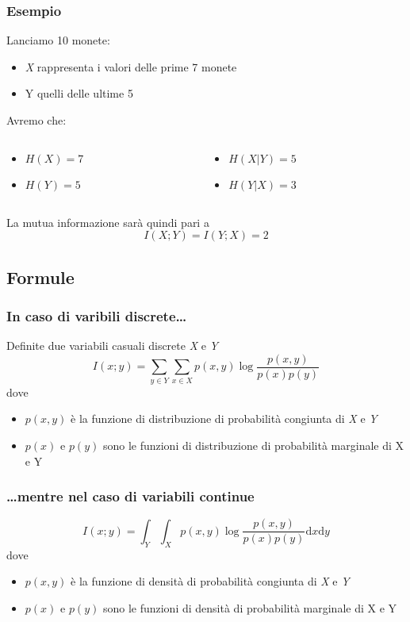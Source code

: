 \documentclass{beamer}
\begin{document}
\begin{frame}
	\frametitle{Esempio}
	Lanciamo 10 monete:
	\begin{itemize}
		\item \emph{X} rappresenta i valori delle prime 7 monete
		\item Y quelli delle ultime 5
	\end{itemize}
	Avremo che:
	\begin{columns}
		\begin{column}{0.455\textwidth}
			\begin{itemize}
				\item $H(X) = 7$
				\item $H(Y) = 5$\newline
			\end{itemize}
		\end{column}
		\begin{column}{0.455\textwidth}
			\begin{itemize}
				\item $H(X|Y) = 5$
				\item $H(Y|X) = 3$\newline
			\end{itemize}
		\end{column}
	\end{columns}
	La mutua informazione sarà quindi pari a
$$I(X; Y ) = I(Y ; X) = 2 $$
\end{frame}
\subsection{Formule}
\begin{frame}
	\frametitle{In caso di varibili discrete\dots}
	Definite due variabili casuali discrete \emph{X} e \emph{Y}
	$$ I (x;y) = \sum\limits_{y \in Y} \sum\limits_{x \in X} p(x,y)\log \frac{p(x,y)}{p(x)p(y)}$$
	dove
	\begin{itemize}
		\item $p(x,y)$ è la funzione di distribuzione di probabilità congiunta di \emph{X} e \emph{Y}
		\item $p(x)$ e $p(y)$ sono le funzioni di distribuzione di probabilità marginale di X e Y
	\end{itemize}
\end{frame}
\begin{frame}
	\frametitle{\dots mentre nel caso di variabili continue}
	$$ I (x;y) = \int_Y \int_X p(x,y)\log \frac{p(x,y)}{p(x)p(y)} \mathrm{d}x \mathrm{d}y$$
	dove
	\begin{itemize}
		\item $p(x,y)$ è la funzione di densità di probabilità congiunta di \emph{X} e \emph{Y}
		\item $p(x)$ e $p(y)$ sono le funzioni di densità di probabilità marginale di X e Y
	\end{itemize}
\end{frame}
\end{document}
